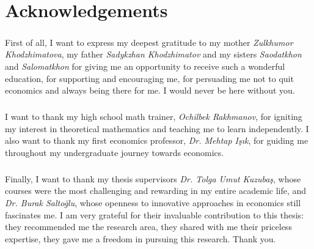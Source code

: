 \chapter*{Acknowledgements}
\vspace{20pt}
  \paragraph*{}First of all, I want to express my deepest gratitude to my mother \textit{Zulkhumor Khodzhimatova}, my father \textit{Sadykzhan Khodzhimatov} and my sisters \textit{Saodatkhon} and \textit{Salomatkhon} for giving me an opportunity to receive such a wonderful education, for supporting and encouraging me, for persuading me not to quit economics and always being there for me. I would never be here without you.
  \paragraph*{}I want to thank my high school math trainer, \textit{Ochilbek Rakhmanov}, for igniting my interest in theoretical mathematics and teaching me to learn independently. I also want to thank my first economics professor, \textit{Dr. Mehtap Işık}, for guiding me throughout my undergraduate journey towards economics.
  \paragraph*{}Finally, I want to thank my thesis supervisors \textit{Dr. Tolga Umut Kuzubaş}, whose courses were the most challenging and rewarding in my entire academic life, and \textit{Dr. Burak Saltoğlu}, whose openness to innovative approaches in economics still fascinates me. I am very grateful for their invaluable contribution to this thesis: they recommended me the research area, they shared with me their priceless expertise, they gave me a freedom in pursuing this research. Thank you.   
